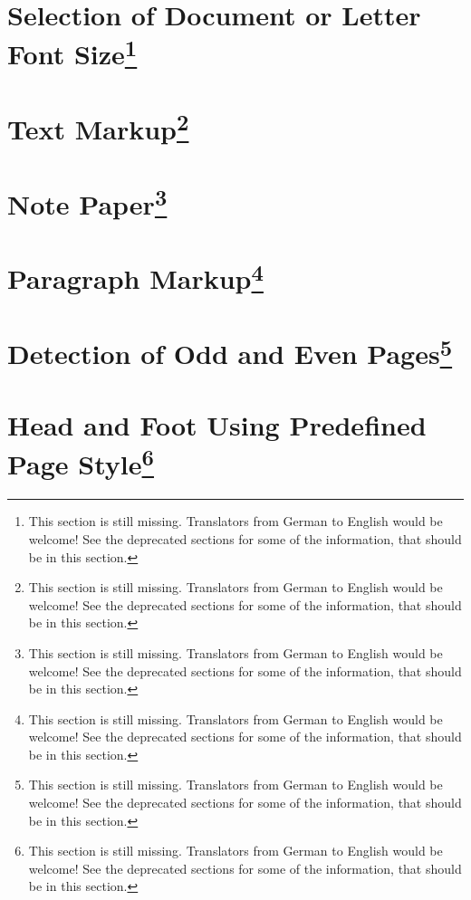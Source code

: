 \section{Selection of Document or Letter Font Size\protect\footnote{This section is still missing. Translators
    from German to English would be welcome! See the deprecated sections for
    some of the information, that should be in this section.}}
\label{sec:scrlttr2.stillmissing}
\mbox{}

\section{Text Markup\protect\footnote{This section is still missing. Translators
    from German to English would be welcome! See the deprecated sections for
    some of the information, that should be in this section.}}
\label{sec:scrlttr2.stillmissing}
\mbox{}

\section{Note Paper\protect\footnote{This section is still missing. Translators
    from German to English would be welcome! See the deprecated sections for
    some of the information, that should be in this section.}}
\label{sec:scrlttr2.stillmissing}
\mbox{}

\section{Paragraph Markup\protect\footnote{This section is still missing. Translators
    from German to English would be welcome! See the deprecated sections for
    some of the information, that should be in this section.}}
\label{sec:scrlttr2.stillmissing}
\mbox{}

\section{Detection of Odd and Even Pages\protect\footnote{This section is still missing. Translators
    from German to English would be welcome! See the deprecated sections for
    some of the information, that should be in this section.}}
\label{sec:scrlttr2.stillmissing}
\mbox{}

\section{Head and Foot Using Predefined Page Style\protect\footnote{This section is still missing. Translators
    from German to English would be welcome! See the deprecated sections for
    some of the information, that should be in this section.}}
\label{sec:scrlttr2.stillmissing}
\mbox{}


